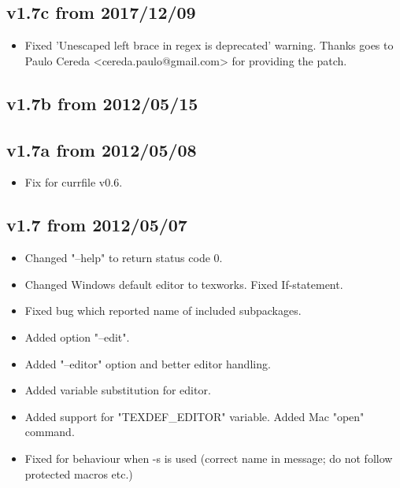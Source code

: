 \documentclass{ydoc}
\begin{document}
\subsection*{v1.7c from 2017/12/09}
\begin{itemize}
 \item Fixed 'Unescaped left brace in regex is deprecated' warning.
   Thanks goes to Paulo Cereda <cereda.paulo@gmail.com> for providing the patch.
\end{itemize}

\subsection*{v1.7b from 2012/05/15}

\subsection*{v1.7a from 2012/05/08}
\begin{itemize}
 \item Fix for currfile v0.6.
\end{itemize}

\subsection*{v1.7 from 2012/05/07}
\begin{itemize}
 \item Changed "--help" to return status code 0.
 \item Changed Windows default editor to texworks. Fixed If-statement.
 \item Fixed bug which reported name of included subpackages.
 \item Added option "--edit".
 \item Added "--editor" option and better editor handling.
 \item Added variable substitution for editor.
 \item Added support for "TEXDEF_EDITOR" variable. Added Mac "open" command.
 \item Fixed for behaviour when -s is used (correct name in message; do not follow protected macros etc.)
\end{itemize}
\end{document}

